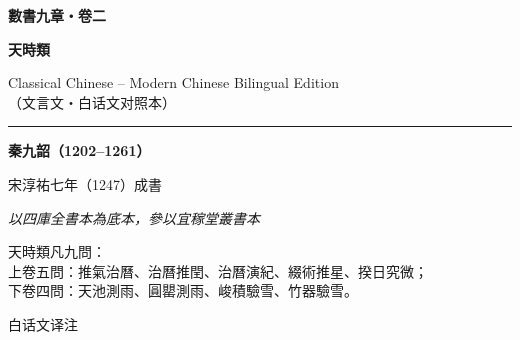\documentclass[11pt,a4paper]{book}
\newcommand{\longline}{\noindent\rule{\textwidth}{0.4pt}}
\begin{document}
\begin{titlepage}
\begin{center}
\vspace*{2cm}

{\fontsize{22}{26}\selectfont\color{titlecolor}
\textbf{數書九章・卷二}}

\vspace{0.8cm}

{\fontsize{16}{20}\selectfont\color{sectioncolor}
\textbf{天時類}}

\vspace{0.5cm}

{\large\color{sectioncolor}
Classical Chinese -- Modern Chinese Bilingual Edition\\
（文言文・白话文对照本）}

\vspace{1.5cm}

\longline

\vspace{1.5cm}

{\large\textbf{秦九韶（1202--1261）}}

\vspace{0.3cm}

{\normalsize 宋淳祐七年（1247）成書}

\vspace{2cm}

{\small\color{sepcolor}
\textit{以四庫全書本為底本，參以宜稼堂叢書本}}

\vfill

{\small 天時類凡九問：}\\[0.5em]
{\footnotesize
上卷五問：推氣治曆、治曆推閏、治曆演紀、綴術推星、揆日究微；\\
下卷四問：天池測雨、圓罌測雨、峻積驗雪、竹器驗雪。}

\vspace{1cm}

{\small 白话文译注}

\end{center}
\end{titlepage}

\tableofcontents
\newpage

\end{document}
